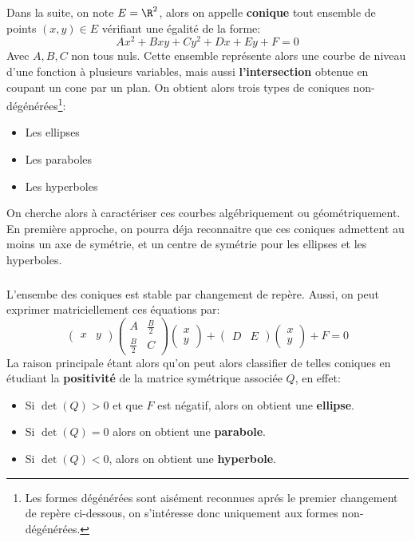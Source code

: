 \documentclass{report}
\begin{document}
\chapter*{}
Dans la suite, on note \(E = \R^2\), alors on appelle \textbf{conique} tout ensemble de points \((x, y) \in E\) vérifiant une égalité de la forme:
\[
   Ax^2 + Bxy + Cy^2 + Dx + Ey + F = 0  
\]
Avec \(A, B, C\) non tous nuls. Cette ensemble représente alors une courbe de niveau d'une fonction à plusieurs variables, mais aussi \textbf{l'intersection} obtenue en coupant un cone par un plan. On obtient alors trois types de coniques non-dégénérées\footnote[1]{Les formes dégénérées sont aisément reconnues aprés le premier changement de repère ci-dessous, on s'intéresse donc uniquement aux formes non-dégénérées.}:
\begin{itemize}
   \item Les ellipses
   \item Les paraboles
   \item Les hyperboles
\end{itemize}
On cherche alors à caractériser ces courbes algébriquement ou géométriquement. En première approche, on pourra déja reconnaitre que ces coniques admettent au moins un axe de symétrie, et un centre de symétrie pour les ellipses et les hyperboles.

\subsection*{}
L'ensembe des coniques est stable par changement de repère. Aussi, on peut exprimer matriciellement ces équations par:
\[
   \begin{pmatrix}x & y\end{pmatrix}\begin{pmatrix}
      A & \frac{B}{2} \\
      \frac{B}{2} & C
   \end{pmatrix} \begin{pmatrix}x \\ y\end{pmatrix} + \begin{pmatrix}D & E\end{pmatrix} \begin{pmatrix}x \\ y\end{pmatrix} + F = 0
\]
La raison principale étant alors qu'on peut alors classifier de telles coniques en étudiant la \textbf{positivité} de la matrice symétrique associée \(Q\), en effet:
\begin{itemize}
   \item Si \(\det({Q}) > 0\) et que \(F\) est négatif, alors on obtient une \textbf{ellipse}.
   \item Si \(\det({Q}) = 0\) alors on obtient une \textbf{parabole}.
   \item Si \(\det({Q}) < 0\), alors on obtient une \textbf{hyperbole}.
\end{itemize}
\end{document}
